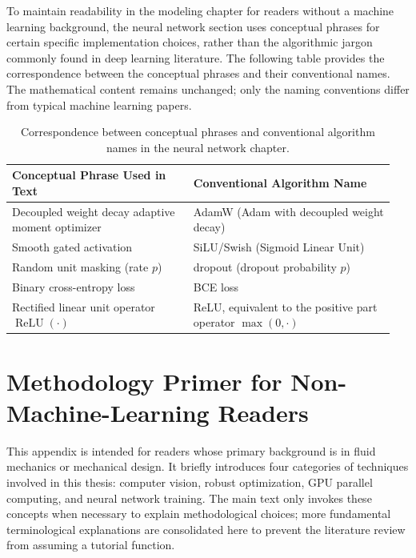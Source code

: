 To maintain readability in the modeling chapter for readers without a machine learning background, the neural network section uses conceptual phrases for certain specific implementation choices, rather than the algorithmic jargon commonly found in deep learning literature. The following table provides the correspondence between the conceptual phrases and their conventional names. The mathematical content remains unchanged; only the naming conventions differ from typical machine learning papers.

\begin{table}[!ht]
\centering
\footnotesize
\begin{tabular}{p{0.45\linewidth} p{0.5\linewidth}}
\toprule
\textbf{Conceptual Phrase Used in Text} & \textbf{Conventional Algorithm Name} \\
\midrule
Decoupled weight decay adaptive moment optimizer & AdamW (Adam with decoupled weight decay) \\
Smooth gated activation & SiLU/Swish (Sigmoid Linear Unit) \cite{Ramachandran2017Swish} \\
Random unit masking (rate $p$) & dropout (dropout probability $p$) \\
Binary cross-entropy loss & BCE loss \\
Rectified linear unit operator $\operatorname{ReLU}(\cdot)$ & ReLU, equivalent to the positive part operator $\max(0,\cdot)$ \\
\bottomrule
\end{tabular}
\caption{Correspondence between conceptual phrases and conventional algorithm names in the neural network chapter.}
\end{table}
\FloatBarrier

\clearpage
\section{Methodology Primer for Non-Machine-Learning Readers}
\label{app:ml-primer-en}

This appendix is intended for readers whose primary background is in fluid mechanics or mechanical design. It briefly introduces four categories of techniques involved in this thesis: computer vision, robust optimization, GPU parallel computing, and neural network training. The main text only invokes these concepts when necessary to explain methodological choices; more fundamental terminological explanations are consolidated here to prevent the literature review from assuming a tutorial function.

